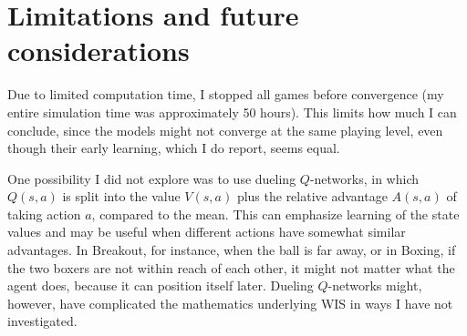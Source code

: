 \documentclass{article}
\begin{document}
\section{Limitations and future considerations}
Due to limited computation time, I stopped all games before convergence (my entire simulation time was approximately 50 hours). This limits how much I can conclude, since the models might not converge at the same playing level, even though their early learning, which I do report, seems equal.

One possibility I did not explore was to use dueling \(Q\)-networks, in which \(Q(s,a)\) is split into the value \(V(s,a)\) plus the relative advantage \(A(s,a)\) of taking action \(a\), compared to the mean. This can emphasize learning of the state values and may be useful when different actions have somewhat similar advantages. In Breakout, for instance, when the ball is far away, or in Boxing, if the two boxers are not within reach of each other, it might not matter what the agent does, because it can position itself later. Dueling \(Q\)-networks might, however, have complicated the mathematics underlying WIS in ways I have not investigated.
\end{document}

